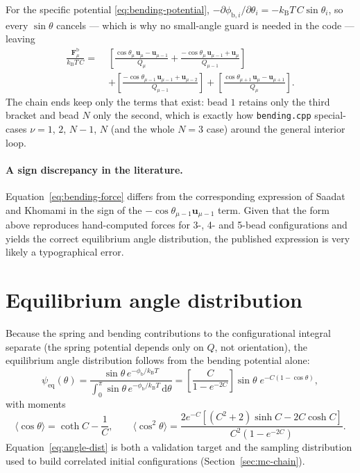 \documentclass[11pt,a4paper]{report}
\newcommand{\uv}{\bm{u}}
\newcommand{\kB}{k_\mathrm{B}}
\newcommand{\code}[1]{\texttt{\seqsplitcode{#1}}}
\newcommand{\seqsplitcode}[1]{#1}
\begin{document}
For the specific potential \eqref{eq:bending-potential},
$-\partial\phi_{\mathrm{b},i}/\partial\theta_i = -\kB T\,C\sin\theta_i$, so every
$\sin\theta$ cancels --- which is why no small-angle guard is needed in the code
--- leaving
\begin{equation}
  \boxed{
  \begin{aligned}
  \frac{\bm{F}^{\mathrm{b}}_\mu}{\kB T\,C} =\;
   &\left[\frac{\cos\theta_\mu\,\uv_\mu-\uv_{\mu-1}}{Q_\mu}
       + \frac{-\cos\theta_\mu\,\uv_{\mu-1}+\uv_\mu}{Q_{\mu-1}}\right] \\
 &+ \left[\frac{-\cos\theta_{\mu-1}\,\uv_{\mu-1}+\uv_{\mu-2}}{Q_{\mu-1}}\right]
  + \left[\frac{\cos\theta_{\mu+1}\,\uv_\mu-\uv_{\mu+1}}{Q_\mu}\right].
  \end{aligned}}
  \label{eq:bending-force}
\end{equation}
The chain ends keep only the terms that exist: bead $1$ retains only the third
bracket and bead $N$ only the second, which is exactly how \code{bending.cpp}
special-cases $\nu = 1$, $2$, $N-1$, $N$ (and the whole $N=3$ case) around the
general interior loop.

\paragraph{A sign discrepancy in the literature.} Equation~\eqref{eq:bending-force}
differs from the corresponding expression of Saadat and Khomami in the sign of
the $-\cos\theta_{\mu-1}\uv_{\mu-1}$ term. Given that the form above reproduces
hand-computed forces for 3-, 4- and 5-bead configurations and yields the correct
equilibrium angle distribution, the published expression is very likely a
typographical error.

\section{Equilibrium angle distribution}

Because the spring and bending contributions to the configurational integral
separate (the spring potential depends only on $Q$, not orientation), the
equilibrium angle distribution follows from the bending potential alone:
\begin{equation}
  \psi_{\mathrm{eq}}(\theta)
    = \frac{\sin\theta\,e^{-\phi_\mathrm{b}/\kB T}}
           {\int_0^\pi \sin\theta\,e^{-\phi_\mathrm{b}/\kB T}\,\mathrm{d}\theta}
    = \left[\frac{C}{1-e^{-2C}}\right]\sin\theta\;e^{-C(1-\cos\theta)} ,
  \label{eq:angle-dist}
\end{equation}
with moments
\begin{equation}
  \langle\cos\theta\rangle = \coth C - \frac{1}{C},
  \qquad
  \langle\cos^{2}\theta\rangle
    = \frac{2e^{-C}\left[(C^{2}+2)\sinh C - 2C\cosh C\right]}{C^{2}\left(1-e^{-2C}\right)} .
\end{equation}
Equation~\eqref{eq:angle-dist} is both a validation target and the sampling
distribution used to build correlated initial configurations
(Section~\ref{sec:mc-chain}).
\end{document}
